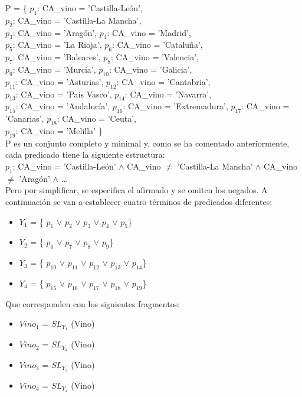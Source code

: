 \documentclass[paper=a4, fontsize=12pt]{article} %
\numberwithin{equation}{section} %
\numberwithin{figure}{section} %
\numberwithin{table}{section} %
\begin{document}
P = \{ $p_{1}$: CA\_vino = 'Castilla-León', \\$p_{2}$: CA\_vino = 'Castilla-La Mancha', \\$p_{3}$: CA\_vino = 'Aragón', 
	$p_{4}$: CA\_vino = 'Madrid', \\$p_{5}$: CA\_vino = 'La Rioja', $p_{6}$: CA\_vino = 'Cataluña', 
	\\$p_{7}$: CA\_vino = 'Baleares', $p_{8}$: CA\_vino = 'Valencia', \\$p_{9}$: CA\_vino = 'Murcia', 
	$p_{10}$: CA\_vino = 'Galicia', \\$p_{11}$: CA\_vino = 'Asturias', $p_{12}$: CA\_vino = 'Cantabria', 
	\\$p_{13}$: CA\_vino = 'País Vasco', $p_{14}$: CA\_vino = 'Navarra', \\$p_{15}$: CA\_vino = 'Andalucía', 
	$p_{16}$: CA\_vino = 'Extremadura', $p_{17}$: CA\_vino = 'Canarias', $p_{18}$: CA\_vino = 'Ceuta',
	\\$p_{19}$: CA\_vino = 'Melilla' \}\\

P es un conjunto completo y minimal y, como se ha comentado anteriormente, cada predicado tiene la siguiente estructura: \\

$p_{1}$: CA\_vino = 'Castilla-León' $\land$ CA\_vino $\neq$ 'Castilla-La Mancha' $\land$ CA\_vino $\neq$ 'Aragón' $\land$ ... \\

Pero por simplificar, se especifica el afirmado y se omiten los negados. A continuación se van a establecer cuatro términos de predicados diferentes:

\begin{itemize}
\item $Y_{1}$ = \{ $p_{1}$ $\vee$ $p_{2}$ $\vee$ $p_{3}$ $\vee$ $p_{4}$ $\vee$ $p_{5}$\}
\item $Y_{2}$ = \{ $p_{6}$ $\vee$ $p_{7}$ $\vee$ $p_{8}$ $\vee$ $p_{9}$\}
\item $Y_{3}$ = \{ $p_{10}$ $\vee$ $p_{11}$ $\vee$ $p_{12}$ $\vee$ $p_{13}$ $\vee$ $p_{14}$\}
\item $Y_{4}$ = \{ $p_{15}$ $\vee$ $p_{16}$ $\vee$ $p_{17}$ $\vee$ $p_{18}$ $\vee$ $p_{19}$\}
\end{itemize}

Que corresponden con los siguientes fragmentos: 

\begin{itemize}
\item $Vino_{1}$ = $SL_{Y_{1}}$ (Vino)
\item $Vino_{2}$ = $SL_{Y_{2}}$ (Vino)
\item $Vino_{3}$ = $SL_{Y_{3}}$ (Vino)
\item $Vino_{4}$ = $SL_{Y_{4}}$ (Vino)
\end{itemize}
\end{document}
